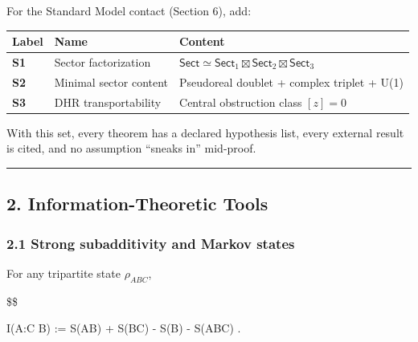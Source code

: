 \documentclass[11pt,a4paper]{article}
\theoremstyle{remark}
\begin{document}
For the Standard Model contact (Section 6), add:

{\def\LTcaptype{none} %
\begin{longtable}[]{@{}
  >{\raggedright\arraybackslash}p{}
  >{\raggedright\arraybackslash}p{}
  >{\raggedright\arraybackslash}p{}@{}}
\toprule\noalign{}
\begin{minipage}[b]{\linewidth}\raggedright
Label
\end{minipage} & \begin{minipage}[b]{\linewidth}\raggedright
Name
\end{minipage} & \begin{minipage}[b]{\linewidth}\raggedright
Content
\end{minipage} \\
\midrule\noalign{}
\endhead
\bottomrule\noalign{}
\endlastfoot
\textbf{S1} & Sector factorization & \(\mathsf{Sect} \simeq \mathsf{Sect}_1 \boxtimes \mathsf{Sect}_2 \boxtimes \mathsf{Sect}_3\) \\
\textbf{S2} & Minimal sector content & Pseudoreal doublet + complex triplet + U(1) \\
\textbf{S3} & DHR transportability & Central obstruction class \([z] = 0\) \\
\end{longtable}
}

With this set, every theorem has a declared hypothesis list, every external
result is cited, and no assumption ``sneaks in'' mid-proof.

\begin{center}\rule{0.5\linewidth}{0.5pt}\end{center}

\subsection{2. Information-Theoretic Tools}\label{information-theoretic-tools}

\subsubsection{2.1 Strong subadditivity and Markov states}\label{strong-subadditivity-and-markov-states}

For any tripartite state \(\rho_{ABC}\),

\$\$

I(A:C \mid B) := S(AB) + S(BC) - S(B) - S(ABC) .
\end{document}
